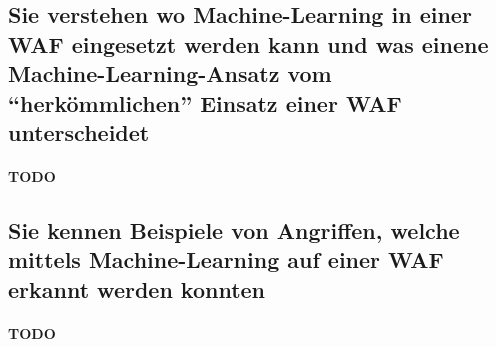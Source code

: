 \documentclass[10pt,a4paper]{article}
\begin{document}
\subsection*{Sie verstehen wo Machine-Learning in einer WAF eingesetzt werden kann und was einene Machine-Learning-Ansatz vom "`herkömmlichen"' Einsatz einer WAF unterscheidet}
\paragraph*{TODO}
\subsection*{Sie kennen Beispiele von Angriffen, welche mittels Machine-Learning auf einer WAF erkannt werden konnten}
\paragraph*{TODO}
\end{document}
